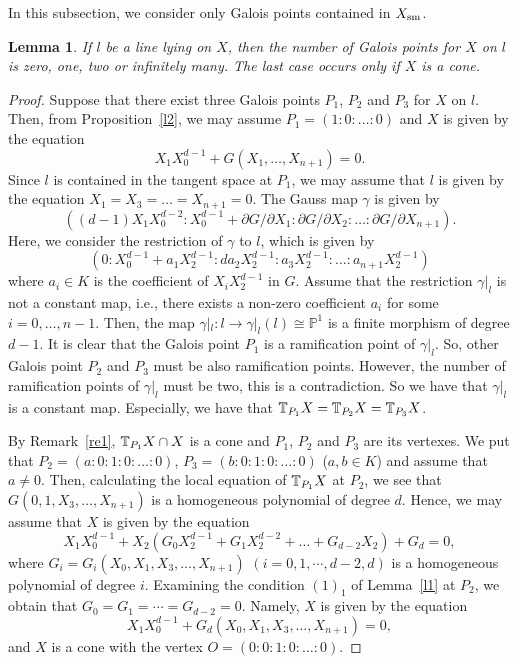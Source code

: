 \documentclass[10pt,oneside]{amsart}
\newtheorem{lemma}{Lemma}
\theoremstyle{definition}
\begin{document}
In this subsection, we consider only Galois points contained in $X_{\rm sm}$. 

\begin{lemma} \label{l3}
If $l$ be a line lying on $X$, then the number of Galois points for $X$ on $l$ is zero, one, two or infinitely many. 
The last case occurs only if $X$ is a cone.  
\end{lemma}

\begin{proof} 
Suppose that there exist three Galois points $P_1$, $P_2$ and $P_3$ for $X$ on $l$. 
Then, from Proposition~\ref{l2}, we may assume $P_1=(1:0:\dots:0)$ and 
$X$ is given by the equation 
$$X_1X_{0}^{d-1} + G(X_1, \dots, X_{n+1}) = 0.$$ 
Since $l$ is contained in the tangent space at $P_1$, we may assume that $l$ is given by the equation $X_1=X_3=\dots=X_{n+1}=0$.   
The Gauss map $\gamma$ is given by 
$$((d-1)X_1X_0^{d-2} : X_0^{d-1}+\partial G/\partial X_{1} : \partial G/\partial X_2 : \dots : \partial G/\partial X_{n+1} ).$$
Here, we consider the restriction of $\gamma$ to $l$, which is given by
$$(0: X_0^{d-1}+a_1X_2^{d-1}: da_2X_2^{d-1}:a_3X_2^{d-1}:\dots:a_{n+1}X_{2}^{d-1})$$
where $a_i \in K$ is the coefficient of $X_iX_{2}^{d-1}$ in $G$. 
Assume that the restriction $\gamma|_l$ is not a constant map, i.e., there exists a non-zero coefficient $a_i$ for some $i=0, \dots, n-1$. 
Then, the map $\gamma|_l: l \rightarrow \gamma|_l(l) \cong \mathbb{P}^1$ is  a finite morphism of degree $d-1$. 
It is clear that the Galois point $P_1$ is a ramification point of $\gamma|_l$. So, other Galois point $P_2$ and $P_3$ must be also ramification points. 
However, the number of ramification points of $\gamma|_l$ must be two, this is a contradiction. 
So we have that $\gamma|_l$ is a constant map. Especially, we have that $\Bbb T_{P_1}X=\Bbb T_{P_2}X=\Bbb T_{P_3}X$.

By Remark~\ref{re1}, $\Bbb T_{P_1}X \cap X$ is a cone and $P_1$, $P_2$ and $P_3$ are its vertexes. 
We put that $P_2=(a:0:1:0:\dots:0)$, $P_3=(b:0:1:0:\dots:0)$ ($a,b \in K$) and assume that $a\ne0$. 
Then, calculating the local equation of $\Bbb T_{P_1}X$ at $P_2$, we see that $G(0, 1, X_3, \ldots, X_{n+1})$ is a homogeneous polynomial of degree $d$. 
Hence, we may assume that $X$ is given by the equation 
$$X_1X_{0}^{d-1} + X_2 ( G_0 X_{2}^{d-1} + G_1 X_{2}^{d-2} + \dots + G_{d-2} X_{2}) + G_d = 0,$$ 
where $G_i=G_i(X_0, X_1, X_3, \ldots, X_{n+1})$ $(i=0,1,\cdots, d-2, d)$ is a homogeneous polynomial of degree $i$. 
Examining the condition $(1)_1$ of Lemma~\ref{l1} at $P_2$, we obtain that $G_0 = G_1 = \cdots = G_{d-2} = 0$. Namely, $X$ is given by the equation $$X_1X_{0}^{d-1} + G_d(X_0, X_1, X_3, \ldots, X_{n+1}) = 0,$$and $X$ is a cone with the vertex $O=(0:0:1:0:\dots:0)$. 
\end{proof}
\end{document}

